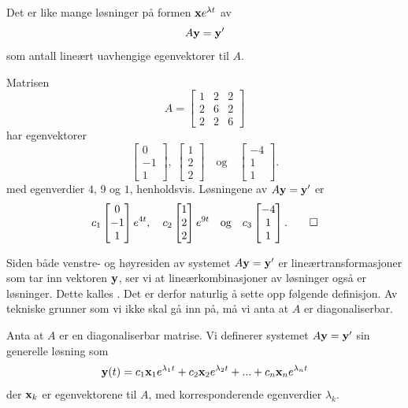 \begin{thm}
Det er like mange løsninger på formen $\mathbf{x} e^{\lambda t}$ av 
\[
A\mathbf{y}=\mathbf{y}'
\]
som antall lineært uavhengige egenvektorer til $A$.
\end{thm}



\begin{ex}
Matrisen
\[
A=
\begin{bmatrix}
1 & 2 & 2\\  2 &6 & 2 \\ 2 & 2 & 6
\end{bmatrix}
\]
har egenvektorer 
\[
\begin{bmatrix}
0 \\ -1 \\ 1
\end{bmatrix},
\;
\begin{bmatrix}
1 \\ 2 \\ 2
\end{bmatrix}
\quad \text{og} \quad
\begin{bmatrix}
-4 \\ 1 \\ 1
\end{bmatrix}.
\]
med egenverdier $4$, 9 og $1$, henholdsvis. Løsningene av $A\mathbf{y}=\mathbf{y}'$ er 
\[
c_1
\begin{bmatrix}
0 \\ -1 \\ 1
\end{bmatrix} e^{4t}, \quad
c_2
\begin{bmatrix}
1 \\ 2 \\ 2
\end{bmatrix}e^{9t}
\quad \text{og} \quad
c_3
\begin{bmatrix}
-4 \\ 1 \\ 1
\end{bmatrix}. \qedhere
\]
\end{ex}

Siden både venstre- og høyresiden av systemet $A\mathbf{y}=\mathbf{y}'$ er lineærtransformasjoner som tar inn vektoren $\mathbf{y}$, 
ser vi at lineærkombinasjoner av løsninger også er løsninger.  Dette kalles .
Det er derfor naturlig å sette opp følgende definisjon. Av tekniske grunner som vi ikke skal gå inn på, må vi anta at $A$ er diagonaliserbar.

\begin{defnx}
Anta at $A$ er en diagonaliserbar matrise. Vi definerer systemet $A\mathbf{y}=\mathbf{y}'$ sin generelle løsning som 
\[
\mathbf{y}(t)=c_1\mathbf{x}_1e^{\lambda_1 t}+c_2\mathbf{x}_2e^{\lambda_2 t}+...+c_n\mathbf{x}_ne^{\lambda_n t}
\]
der $\mathbf{x}_k$ er egenvektorene til $A$, med korresponderende egenverdier $\lambda_k$.
\end{defnx}

